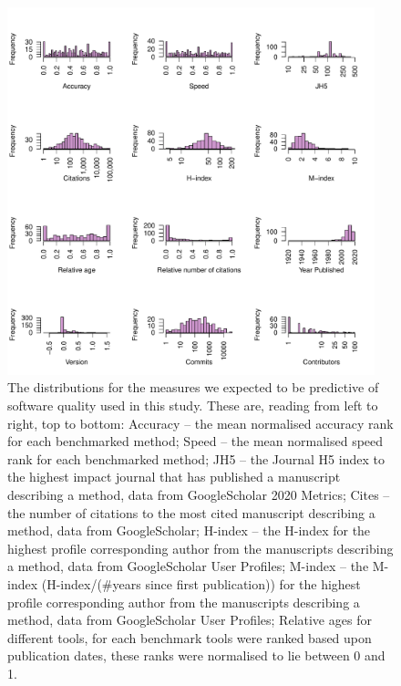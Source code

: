 \documentclass[fleqn,10pt]{SelfArx} %
\begin{document}
\begin{figure}[htb!]
\centering
\includegraphics[width=0.95\textwidth]{supplementary-figures-small.pdf}
\caption{The distributions for the measures we expected to be
  predictive of software quality used in this study. These
are, reading from left to right, top to bottom: Accuracy -- the mean
normalised accuracy rank for each benchmarked method; Speed -- the
mean normalised speed rank for each benchmarked method;
JH5 -- the Journal H5 index to the highest impact journal that has published
a manuscript describing a method, data from GoogleScholar 2020 Metrics;
Cites -- the number of citations to the most cited manuscript describing a method, data from GoogleScholar;
H-index -- the H-index for the highest profile corresponding author from the
manuscripts describing a method, data from GoogleScholar User Profiles;
M-index -- the M-index (H-index/(\#years since first publication)) for the
highest profile corresponding author from the manuscripts describing a method,
data from GoogleScholar User Profiles;
Relative ages for different tools, for each benchmark tools were ranked based upon publication dates, these ranks were normalised to lie between 0 and 1.
}
\label{fig:metricDistributions}
\end{figure}
\end{document}
